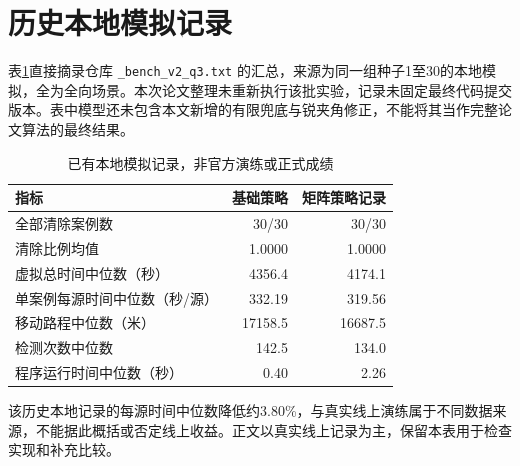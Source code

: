 \section{历史本地模拟记录}
表\ref{tab:mock}直接摘录仓库 \texttt{\_bench\_v2\_q3.txt} 的汇总，来源为同一组种子1至30的本地模拟，全为全向场景。本次论文整理未重新执行该批实验，记录未固定最终代码提交版本。表中模型还未包含本文新增的有限兜底与锐夹角修正，不能将其当作完整论文算法的最终结果。
\begin{table}[htbp]\centering
\caption{已有本地模拟记录，非官方演练或正式成绩}\label{tab:mock}
\begin{tabular}{lrr}\toprule
指标&基础策略&矩阵策略记录\\\midrule
全部清除案例数&30/30&30/30\\
清除比例均值&1.0000&1.0000\\
虚拟总时间中位数（秒）&4356.4&4174.1\\
单案例每源时间中位数（秒/源）&332.19&319.56\\
移动路程中位数（米）&17158.5&16687.5\\
检测次数中位数&142.5&134.0\\
程序运行时间中位数（秒）&0.40&2.26\\\bottomrule
\end{tabular}\end{table}
该历史本地记录的每源时间中位数降低约3.80\%，与真实线上演练属于不同数据来源，不能据此概括或否定线上收益。正文以真实线上记录为主，保留本表用于检查实现和补充比较。

